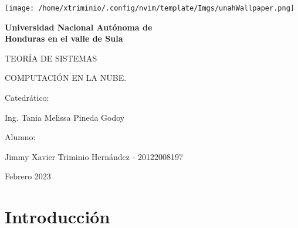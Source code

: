 \documentclass[12pt]{article}
\begin{document}
\begin{titlepage}

  \begin{center}
    {\texttt{[image: /home/xtriminio/.config/nvim/template/Imgs/unahWallpaper.png]}\par}

    
  
    {\bfseries\Huge Universidad Nacional Autónoma de\\
                     Honduras en el valle de Sula \par}
  
    \vspace{1cm}
  
    {\scshape\huge TEORÍA DE SISTEMAS\par}
  
    \vspace{1cm}
  
    {\scshape\Large COMPUTACIÓN EN LA NUBE.}
  
    \vfill 
    {\large Catedrático:\par} %
    {\large Ing. Tania Melissa Pineda Godoy \par} %
  
    \vfill
    {\large Alumno: \par}
    {\large Jimmy Xavier Triminio Hernández - 20122008197 \par}

    \vfill
    {\large Febrero 2023\par} %

  \end{center}

\end{titlepage}

\newpage
\tableofcontents

\vspace{1cm}
\section{ Introducción }
\end{document}
